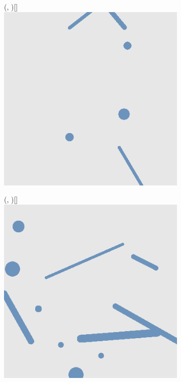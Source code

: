 
\def\w{0.31\textwidth}
\begin{figure}[H]
    \begin{subfigure}{\w}
        \makebox(\textwidth, \textwidth)[\textwidth]{
            \includegraphics[width=\linewidth]{figures/generated-worlds/world_0.png}
        }
    \end{subfigure}
    \hspace*{\fill}
    \begin{subfigure}{\w}
        \makebox(\textwidth, \textwidth)[\textwidth]{
            \includegraphics[width=\linewidth]{figures/generated-worlds/world_1.png}
}
\end{subfigure}
\end{figure}
